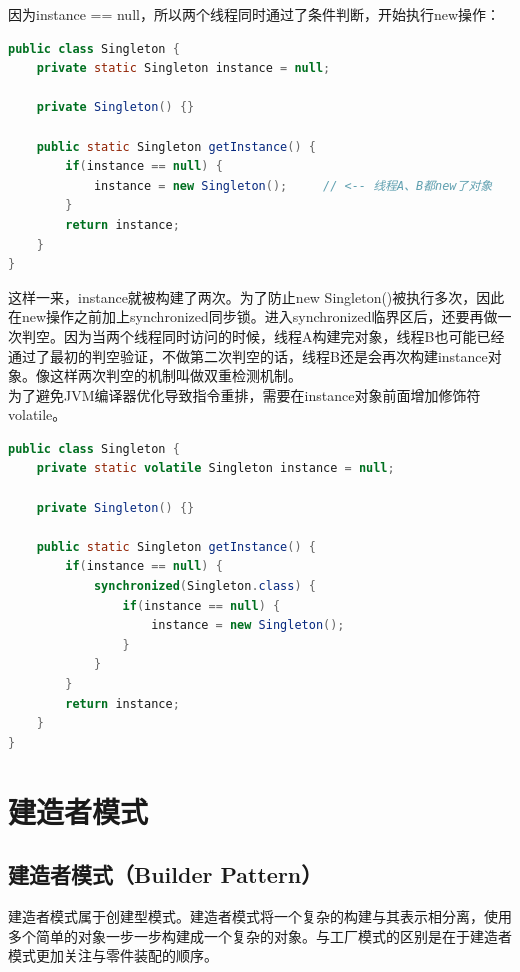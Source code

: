 因为instance == null，所以两个线程同时通过了条件判断，开始执行new操作：

\begin{lstlisting}[language=Java]
public class Singleton {
    private static Singleton instance = null;

    private Singleton() {}

    public static Singleton getInstance() {
        if(instance == null) {
            instance = new Singleton();     // <-- 线程A、B都new了对象
        }
        return instance;
    }
}
\end{lstlisting}

这样一来，instance就被构建了两次。为了防止new Singleton()被执行多次，因此在new操作之前加上synchronized同步锁。进入synchronized临界区后，还要再做一次判空。因为当两个线程同时访问的时候，线程A构建完对象，线程B也可能已经通过了最初的判空验证，不做第二次判空的话，线程B还是会再次构建instance对象。像这样两次判空的机制叫做双重检测机制。\\

为了避免JVM编译器优化导致指令重排，需要在instance对象前面增加修饰符volatile。\\


\begin{lstlisting}[language=Java]
public class Singleton {
    private static volatile Singleton instance = null;

    private Singleton() {}

    public static Singleton getInstance() {
        if(instance == null) {
            synchronized(Singleton.class) {
                if(instance == null) {
                    instance = new Singleton();
                }
            }
        }
        return instance;
    }
}
\end{lstlisting}

\newpage

\section{建造者模式}

\subsection{建造者模式（Builder Pattern）}

建造者模式属于创建型模式。建造者模式将一个复杂的构建与其表示相分离，使用多个简单的对象一步一步构建成一个复杂的对象。与工厂模式的区别是在于建造者模式更加关注与零件装配的顺序。\\

